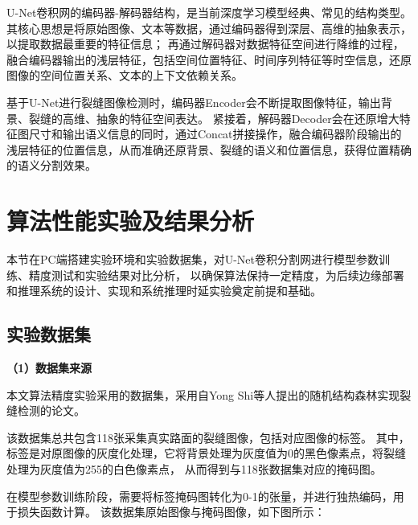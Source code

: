 U-Net卷积网的编码器-解码器结构，是当前深度学习模型经典、常见的结构类型。
其核心思想是将原始图像、文本等数据，通过编码器得到深层、高维的抽象表示，以提取数据最重要的特征信息；
再通过解码器对数据特征空间进行降维的过程，融合编码器输出的浅层特征，包括空间位置特征、时间序列特征等时空信息，还原图像的空间位置关系、文本的上下文依赖关系。

基于U-Net进行裂缝图像检测时，编码器Encoder会不断提取图像特征，输出背景、裂缝的高维、抽象的特征空间表达。
紧接着，解码器Decoder会在还原增大特征图尺寸和输出语义信息的同时，通过Concat拼接操作，融合编码器阶段输出的浅层特征的位置信息，从而准确还原背景、裂缝的语义和位置信息，获得位置精确的语义分割效果。


\section{算法性能实验及结果分析}
本节在PC端搭建实验环境和实验数据集，对U-Net卷积分割网进行模型参数训练、精度测试和实验结果对比分析，
以确保算法保持一定精度，为后续边缘部署和推理系统的设计、实现和系统推理时延实验奠定前提和基础。

\subsection{实验数据集}
\textbf{（1）数据集来源}

本文算法精度实验采用的数据集，采用自Yong Shi等人提出的随机结构森林实现裂缝检测的论文。

该数据集总共包含118张采集真实路面的裂缝图像，包括对应图像的标签。
其中，标签是对原图像的灰度化处理，它将背景处理为灰度值为0的黑色像素点，将裂缝处理为灰度值为255的白色像素点，
从而得到与118张数据集对应的掩码图。

在模型参数训练阶段，需要将标签掩码图转化为0-1的张量，并进行独热编码，用于损失函数计算。
该数据集原始图像与掩码图像，如下图所示：


